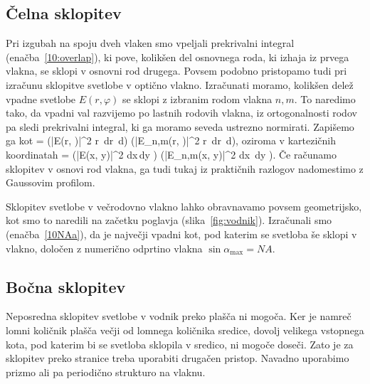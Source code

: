 \subsection*{Čelna sklopitev}
Pri izgubah na spoju dveh vlaken smo vpeljali prekrivalni integral (enačba~\ref{10:overlap}), 
ki pove, kolikšen del osnovnega roda, ki izhaja iz prvega vlakna, se sklopi v osnovni 
rod drugega. Povsem podobno pristopamo tudi pri izračunu sklopitve svetlobe v optično vlakno. 
Izračunati moramo, kolikšen delež vpadne svetlobe $E(r, \varphi)$ se sklopi z izbranim rodom 
vlakna $n,m$. To naredimo tako, da vpadni val razvijemo po lastnih rodovih vlakna, iz ortogonalnosti
rodov pa sledi prekrivalni integral, ki ga moramo seveda ustrezno normirati. Zapišemo ga kot
\beq
\eta = 
{\left(\int |E(r, \varphi)|^2 r\, dr\, d\varphi \right) \left(\int |E_{n,m}(r, \varphi)|^2 
r\, dr\, d\varphi \right)},
\eeq
oziroma v kartezičnih koordinatah
\beq
\eta = 
{\left(\int |E(x, y)|^2 dx\,dy \right) \left(\int |E_{n,m}(x, y)|^2 
dx\, dy \right)}.
\eeq
Če računamo sklopitev v osnovi rod vlakna, ga tudi tukaj iz praktičnih razlogov nadomestimo 
z Gaussovim profilom.

\begin{remark}
Sklopitev svetlobe v večrodovno vlakno lahko obravnavamo povsem geometrijsko, kot smo to naredili
na začetku poglavja (slika~\ref{fig:vodnik}). Izračunali smo (enačba~\ref{10NAa}), da je največji 
vpadni kot, pod katerim se svetloba še sklopi v vlakno, določen z numerično odprtino 
vlakna $\sin \alpha_{\mathrm{max}}= NA$.
\end{remark}

\subsection*{Bočna sklopitev}
Neposredna sklopitev svetlobe v vodnik preko plašča ni mogoča. Ker je namreč lomni količnik
plašča večji od lomnega količnika sredice, dovolj velikega vstopnega kota, pod katerim bi 
se svetloba sklopila v sredico, ni mogoče doseči. Zato je za sklopitev preko stranice treba 
uporabiti drugačen pristop. Navadno uporabimo prizmo ali pa periodično strukturo na vlaknu. 

